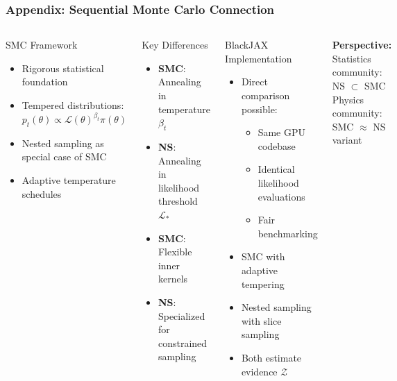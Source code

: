 \documentclass[aspectratio=169]{beamer}
\begin{document}
\begin{frame}
    \frametitle{Appendix: Sequential Monte Carlo Connection}
    \begin{columns}
        \begin{block}{SMC Framework}
            \begin{itemize}
                \item Rigorous statistical foundation
                \item Tempered distributions: $p_t(\theta) \propto \mathcal{L}(\theta)^{\beta_t} \pi(\theta)$
                \item Nested sampling as special case of SMC
                \item Adaptive temperature schedules
            \end{itemize}
        \end{block}
        \begin{block}{Key Differences}
            \begin{itemize}
                \item \textbf{SMC}: Annealing in temperature $\beta_t$
                \item \textbf{NS}: Annealing in likelihood threshold $\mathcal{L}_*$
                \item \textbf{SMC}: Flexible inner kernels
                \item \textbf{NS}: Specialized for constrained sampling
            \end{itemize}
        \end{block}
        \begin{block}{BlackJAX Implementation}
            \begin{itemize}
                \item Direct comparison possible:
                    \begin{itemize}
                        \item Same GPU codebase
                        \item Identical likelihood evaluations
                        \item Fair benchmarking
                    \end{itemize}
                \item SMC with adaptive tempering
                \item Nested sampling with slice sampling
                \item Both estimate evidence $\mathcal{Z}$
            \end{itemize}
        \end{block}
        \vspace{10pt}
        \begin{center}
            \textbf{Perspective:}\\
            Statistics community: NS $\subset$ SMC\\
            Physics community: SMC $\approx$ NS variant
        \end{center}
    \end{columns}
\end{frame}
\end{document}
